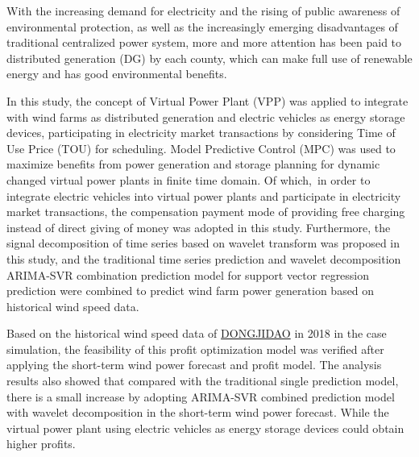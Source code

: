 \begin{abstract*}

With the increasing demand for electricity and the rising of public awareness of environmental protection, as well as the increasingly emerging disadvantages of traditional centralized power system, more and more attention has been paid to distributed generation (DG) by each county, which can make full use of renewable energy and has good environmental benefits.

In this study, the concept of Virtual Power Plant (VPP) was applied to integrate with wind farms as distributed generation and electric vehicles as energy storage devices, participating in electricity market transactions by considering Time of Use Price (TOU) for scheduling. Model Predictive Control (MPC) was used to maximize benefits from power generation and storage planning for dynamic changed virtual power plants in finite time domain. Of which, in order to integrate electric vehicles into virtual power plants and participate in electricity market transactions, the compensation payment mode of providing free charging instead of direct giving of money was adopted in this study. Furthermore, the signal decomposition of time series based on wavelet transform was proposed in this study, and the traditional time series prediction and wavelet decomposition ARIMA-SVR combination prediction model for support vector regression  prediction were combined to predict wind farm power generation based on historical wind speed data.

Based on the historical wind speed data of \uline{DONGJIDAO} in 2018 in the case simulation, the feasibility of this profit optimization model was verified after applying the short-term wind power forecast and profit model. The analysis results also showed that compared with the traditional single prediction model, there is a small increase by adopting ARIMA-SVR combined prediction model with wavelet decomposition in the short-term wind power forecast. While the virtual power plant using electric vehicles as energy storage devices could obtain higher profits.

\end{abstract*}
